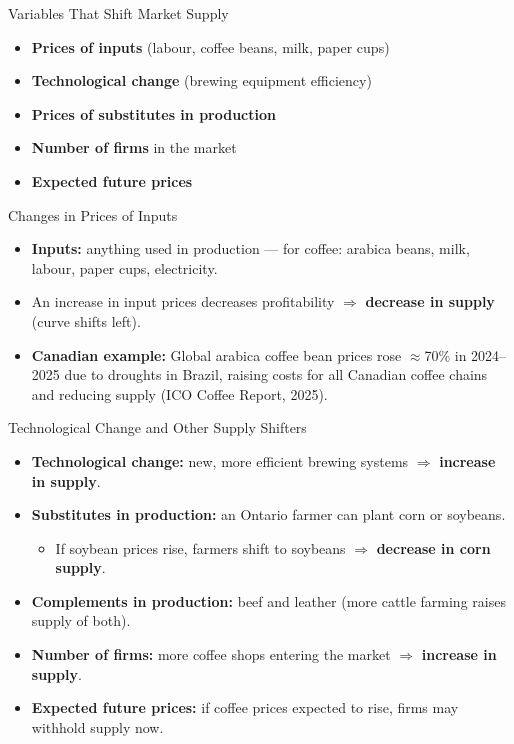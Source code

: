 \documentclass[aspectratio=169]{beamer}
\begin{document}
\begin{frame}{Variables That Shift Market Supply}
\transfade
\begin{itemize}
  \item \textbf{Prices of inputs} (labour, coffee beans, milk, paper cups)
  \item \textbf{Technological change} (brewing equipment efficiency)
  \item \textbf{Prices of substitutes in production}
  \item \textbf{Number of firms} in the market
  \item \textbf{Expected future prices}
\end{itemize}
\end{frame}

\begin{frame}{Changes in Prices of Inputs}
\transfade
\begin{itemize}
  \item \textbf{Inputs:} anything used in production --- for coffee: arabica beans, milk, labour, paper cups, electricity.
  \item An \alert{increase} in input prices decreases profitability $\Rightarrow$ \textbf{decrease in supply} (curve shifts left).
  \item \textbf{Canadian example:} Global arabica coffee bean prices rose $\approx$70\% in 2024--2025 due to droughts in Brazil, raising costs for all Canadian coffee chains and reducing supply (ICO Coffee Report, 2025).
\end{itemize}
\end{frame}

\begin{frame}{Technological Change and Other Supply Shifters}
\transfade
\begin{itemize}
  \item \textbf{Technological change:} new, more efficient brewing systems $\Rightarrow$ \textbf{increase in supply}.
  \item \textbf{Substitutes in production:} an Ontario farmer can plant corn or soybeans.
  \begin{itemize}
    \item If soybean prices rise, farmers shift to soybeans $\Rightarrow$ \textbf{decrease in corn supply}.
  \end{itemize}
  \item \textbf{Complements in production:} beef and leather (more cattle farming raises supply of both).
  \item \textbf{Number of firms:} more coffee shops entering the market $\Rightarrow$ \textbf{increase in supply}.
  \item \textbf{Expected future prices:} if coffee prices expected to rise, firms may withhold supply now.
\end{itemize}
\end{frame}
\end{document}
